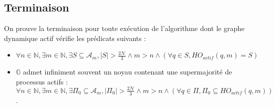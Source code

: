 \documentclass{article}
\begin{document}
\subsection{Terminaison}

On prouve la terminaison pour toute exécution de l'algorithme dont le graphe dynamique actif vérifie les prédicats suivants :
\begin{itemize}
	\item $\forall n \in \mathds{N}, \exists m \in \mathds{N}, \exists S \subseteq \mathcal{A}_m, |S| > \frac{2\mathcal{N}}{3} \wedge m > n \wedge (\forall q \in S, HO_{actif}(q, m) = S)$
	\item $\mathds{G}$ admet infiniment souvent un noyau contenant une supermajorité de processus actifs :
		$\forall n \in \mathds{N}, \exists m \in \mathds{N}, \exists \Pi_0 \subseteq \mathcal{A}_m, |\Pi_0| > \frac{2\mathcal{N}}{3} \wedge m > n \wedge (\forall q \in \Pi, \Pi_0 \subseteq HO_{actif}(q,m))$.
\end{itemize}
\end{document}
